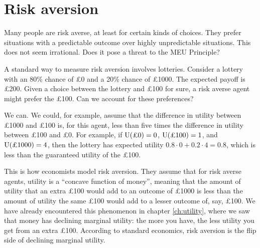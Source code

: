 \section{Risk aversion}


Many people are risk averse, at least for certain kinds of choices. They prefer
situations with a predictable outcome over highly unpredictable situations. This
does not seem irrational. Does it pose a threat to the MEU Principle?

A standard way to measure risk aversion involves lotteries. Consider a lottery
with an 80\% chance of £0 and a 20\% chance of £1000. The expected payoff is
£200. Given a choice between the lottery and £100 for sure, a risk averse agent
might prefer the £100. Can we account for these preferences?

We can. We could, for example, assume that the difference in utility between
£1000 and £100 is, for this agent, less than five times the difference in
utility between £100 and £0. For example, if $\text{U}(\text{£0}) = 0$,
$\text{U}(\text{£100}) = 1$, and $\text{U}(\text{£1000}) = 4$, then the lottery has expected
utility $0.8 \cdot 0 + 0.2 \cdot 4 = 0.8$, which is less than the guaranteed
utility of the £100.

This is how economists model risk aversion. They assume that for risk averse agents,
utility is a ``concave function of money'', meaning that the amount
of utility that an extra £100 would add to an outcome of £1000 is less than the
amount of utility the same £100 would add to a lesser outcome of, say, £100. We
have already encountered this phenomenon in chapter \ref{ch:utility}, where we
saw that money has declining marginal utility: the more you have, the less
utility you get from an extra £100. According to standard economics, risk
aversion is the flip side of declining marginal utility.

